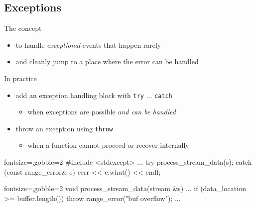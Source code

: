 \subsection[except]{Exceptions}

\begin{frame}[fragile]
  \begin{block}{The concept}
    \begin{itemize}
      \item to handle \textit{exceptional} events that happen rarely
      \item and cleanly jump to a place where the error can be handled
    \end{itemize}
  \end{block}
  \begin{block}{In practice}
    \begin{itemize}
      \item add an exception handling block with \texttt{try} ... \texttt{catch}
      \begin{itemize}
        \item when exceptions are possible \textit{and can be handled}
      \end{itemize}
      \item throw an exception using \texttt{throw}
      \begin{itemize}
        \item when a function cannot proceed or recover internally
      \end{itemize}
    \end{itemize}
  \end{block}
  \begin{multicols}{2}
    \begin{cppcode*}{fontsize=\scriptsize,gobble=2}
      #include <stdexcept>
      ...
      try {
        process_stream_data(s);
      } catch (const range_error& e) {
        cerr << e.what() << endl;
      }
    \end{cppcode*}
    \columnbreak
    \begin{cppcode*}{fontsize=\scriptsize,gobble=2}
      void process_stream_data(stream &s) {
        ...
        if (data_location >= buffer.length()) {
          throw range_error("buf overflow");
        }
        ...
      }
    \end{cppcode*}
  \end{multicols}
\end{frame}

